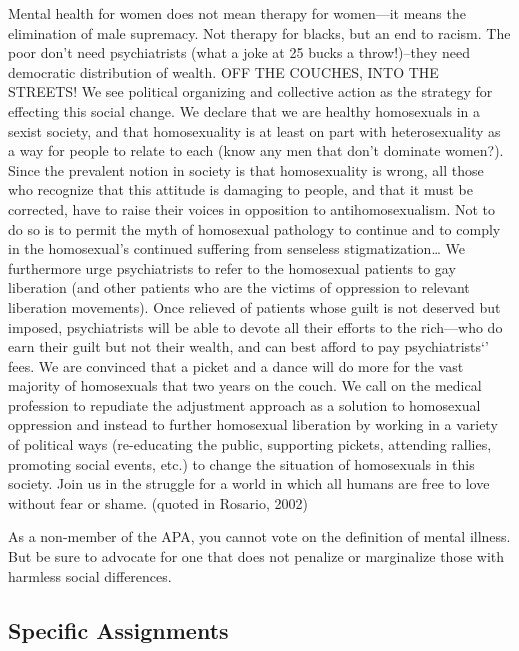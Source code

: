 Mental health for women does not mean therapy for women—it means the elimination of male supremacy. Not therapy for blacks, but an end to racism. The poor don't need psychiatrists (what a joke at 25 bucks a throw!)--they need democratic distribution of wealth. OFF THE COUCHES, INTO THE STREETS!
We see political organizing and collective action as the strategy for effecting this social change. We declare that we are healthy homosexuals in a sexist society, and that homosexuality is at least on part with heterosexuality as a way for people to relate to each (know any men that don't dominate women?).
Since the prevalent notion in society is that homosexuality is wrong, all those who recognize that this attitude is damaging to people, and that it must be corrected, have to raise their voices in opposition to antihomosexualism. Not to do so is to permit the myth of homosexual pathology to continue and to comply in the homosexual's continued suffering from senseless stigmatization{\ldots} We furthermore urge psychiatrists to refer to the homosexual patients to gay liberation (and other patients who are the victims of oppression to relevant liberation movements). Once relieved of patients whose guilt is not deserved but imposed, psychiatrists will be able to devote all their efforts to the rich—who do earn their guilt but not their wealth, and can best afford to pay psychiatrists`' fees.
We are convinced that a picket and a dance will do more for the vast majority of homosexuals that two years on the couch. We call on the medical profession to repudiate the adjustment approach as a solution to homosexual oppression and instead to further homosexual liberation by working in a variety of political ways (re-educating the public, supporting pickets, attending rallies, promoting social events, etc.) to change the situation of homosexuals in this society.
Join us in the struggle for a world in which all humans are free to love without fear or shame.
(quoted in Rosario, 2002)

As a non-member of the APA, you cannot vote on the definition of mental illness. But be sure to advocate for one that does not penalize or marginalize those with harmless social differences.

\subsection{Specific Assignments}
\label{specificassignments}

